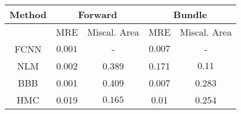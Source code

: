 \documentclass[convert={outext=.png}]{standalone}
\begin{document}
\centering
\label{tab:experimental_results}



\begin{tabular}{c c c c c}
\hline
\hline
Method &  \multicolumn{2}{c}{Forward} & \multicolumn{2}{c}{Bundle} \\ \hline
 & MRE & Miscal. Area & MRE & Miscal. Area\\
 FCNN & $\mathbf{0.001}$ & - & $\mathbf{0.007}$ & - \\
 \hline
 NLM & 0.002 & 0.389 & 0.171 & $\mathbf{0.11}$ \\
 BBB & 0.001 & 0.409 & 0.007 & 0.283 \\
 HMC & 0.019 & $\mathbf{0.165}$ & 0.01 & 0.254 \\
\hline
\hline
\end{tabular}
\end{document}
